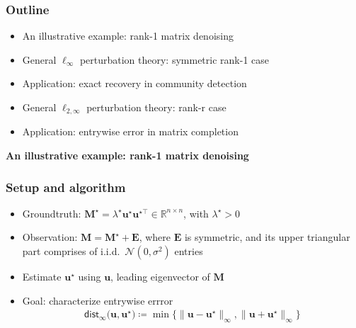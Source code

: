 \documentclass[compress,
mathserif,wide,%
]{beamer}
\begin{document}
\begin{frame}
\frametitle{Outline}

\begin{itemize}
  \itemsep1em
  \item An illustrative example: rank-1 matrix denoising
  \item General $\ell_{\infty}$ perturbation theory: symmetric rank-1 case
  \item Application: exact recovery in community detection
  \item General $\ell_{2,\infty}$ perturbation theory: rank-r case
  \item Application: entrywise error in matrix completion
\end{itemize}

\end{frame}

\begin{frame}[plain]
\vfill
\centering
\Large \bf An illustrative example: rank-1 matrix denoising
\vfill
\end{frame}



\begin{frame}
	\frametitle{Setup and algorithm}
	
	\begin{itemize}
		\itemsep 0.5em
		\item Groundtruth: $\bm{M}^{\star} = \lambda^{\star} \bm{u}^{\star} \bm{u}^{\star\top}\in \mathbb{R}^{n\times n}$, with $\lambda^\star > 0$
		\item Observation: $\bm{M} = \bm{M}^{\star} + \bm{E}$, where $\bm{E}$ is symmetric, and its upper triangular part comprises of i.i.d.~$\mathcal{N}(0, \sigma^2)$ entries
		\item Estimate $\bm{u}^{\star}$ using $\bm{u}$, leading eigenvector of $\bm{M}$
		\item Goal: characterize entrywise errror
		 \begin{align*}
	\mathsf{dist}_{\infty}\big(\bm{u},\bm{u}^{\star}\big)
	\coloneqq \min\big\{ \|\bm{u}-\bm{u}^{\star}\|_{\infty}, \|\bm{u}+\bm{u}^{\star}\|_{\infty} \big\}
\end{align*}
	\end{itemize}


\end{frame}
\end{document}
